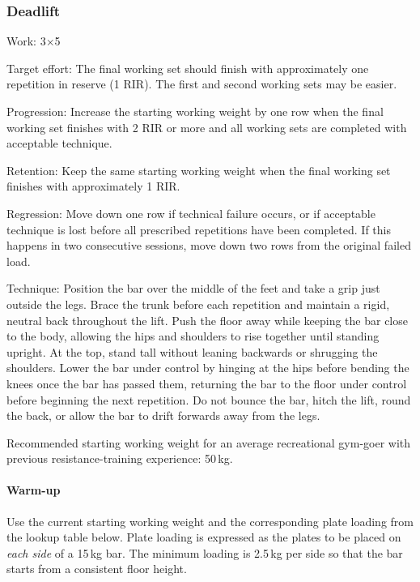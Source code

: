 \documentclass[11pt,a4paper]{article}
\begin{document}
\newpage
\subsubsection{Deadlift}

Work: 3$\times$5

Target effort: The final working set should finish with approximately one repetition in reserve (1 RIR). The first and second working sets may be easier.

Progression: Increase the starting working weight by one row when the final working set finishes with 2 RIR or more and all working sets are completed with acceptable technique.

Retention: Keep the same starting working weight when the final working set finishes with approximately 1 RIR.

Regression: Move down one row if technical failure occurs, or if acceptable technique is lost before all prescribed repetitions have been completed. If this happens in two consecutive sessions, move down two rows from the original failed load.

Technique: Position the bar over the middle of the feet and take a grip just outside the legs. Brace the trunk before each repetition and maintain a rigid, neutral back throughout the lift. Push the floor away while keeping the bar close to the body, allowing the hips and shoulders to rise together until standing upright. At the top, stand tall without leaning backwards or shrugging the shoulders. Lower the bar under control by hinging at the hips before bending the knees once the bar has passed them, returning the bar to the floor under control before beginning the next repetition. Do not bounce the bar, hitch the lift, round the back, or allow the bar to drift forwards away from the legs.

Recommended starting working weight for an average recreational gym-goer with previous resistance-training experience: 50\,kg.

\paragraph{Warm-up}

Use the current starting working weight and the corresponding plate loading from the lookup table below. Plate loading is expressed as the plates to be placed on \emph{each side} of a 15\,kg bar. The minimum loading is 2.5\,kg per side so that the bar starts from a consistent floor height.
\end{document}
